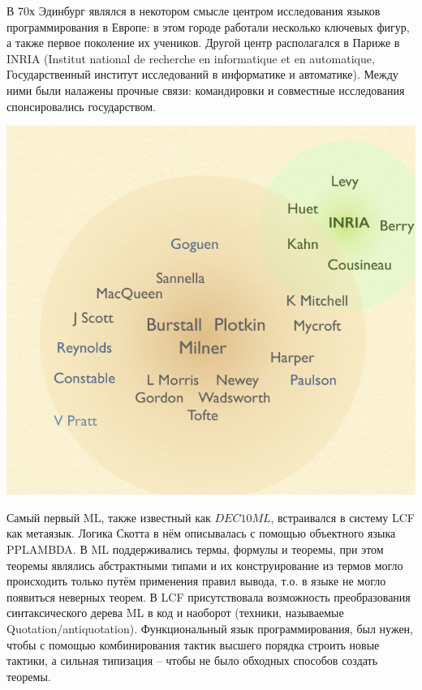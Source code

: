 \documentclass[14pt]{matmex-diploma-custom}
\begin{document}
В 70х Эдинбург являлся в некотором смысле центром исследования языков программирования в Европе: в этом городе работали несколько ключевых фигур, а также первое поколение их учеников. Другой центр располагался в Париже в INRIA (Institut national de recherche en informatique et en automatique, Государственный институт исследований в информатике и автоматике). Между ними были налажены прочные связи: командировки и совместные исследования спонсировались государством.

\includegraphics[angle=0,scale=0.7]{two_circles.png}

Самый первый ML, также известный как $DEC10 ML$, встраивался в систему LCF как метаязык. Логика Скотта в нём описывалась с помощью объектного языка PPLAMBDA. В ML поддерживались термы, формулы и теоремы, при этом теоремы являлись абстрактными типами и их конструирование из термов могло происходить только путём применения правил вывода, т.о. в языке не могло появиться неверных теорем. В LCF присутствовала возможность преобразования синтаксического  дерева ML в код и наоборот (техники, называемые Quotation/antiquotation). Функциональный язык программирования, был нужен, чтобы с помощью комбинирования тактик высшего порядка строить новые тактики, а сильная типизация -- чтобы не было обходных способов создать теоремы.
\end{document}
